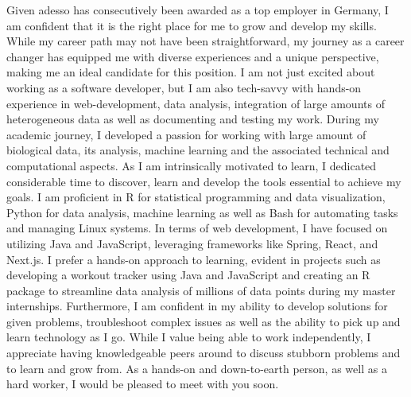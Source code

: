 \documentclass[11pt, a4paper]{awesome-cv}
\begin{document}
\begin{cvletter}
Given adesso has consecutively been awarded as a top employer in Germany, I am confident that it is the right place for me to grow and develop my skills.
While my career path may not have been straightforward, my journey as a career changer has equipped me with diverse experiences and a unique perspective, making me an ideal candidate for this position.
I am not just excited about working as a software developer, but I am also tech-savvy with hands-on experience in web-development, data analysis, integration of large amounts of heterogeneous data as well as documenting and testing my work.
During my academic journey, I developed a passion for working with large amount of biological data, its analysis, machine learning and the associated technical and computational aspects.
As I am intrinsically motivated to learn, I dedicated considerable time to discover, learn and develop the tools essential to achieve my goals.
I am proficient in R for statistical programming and data visualization, Python for data analysis, machine learning as well as Bash for automating tasks and managing Linux systems.
In terms of web development, I have focused on utilizing Java and JavaScript, leveraging frameworks like Spring, React, and Next.js. 
I prefer a hands-on approach to learning, evident in projects such as developing a workout tracker using Java and JavaScript and creating an R package to streamline data analysis of millions of data points during my master internships.
Furthermore, I am confident in my ability to develop solutions for given problems, troubleshoot complex issues as well as the ability to pick up and learn technology as I go.
While I value being able to work independently, I appreciate having knowledgeable peers around to discuss stubborn problems and to learn and grow from.
As a hands-on and down-to-earth person, as well as a hard worker, I would be pleased to meet with you soon.
\end{cvletter}
\makeletterclosing
\end{document}
